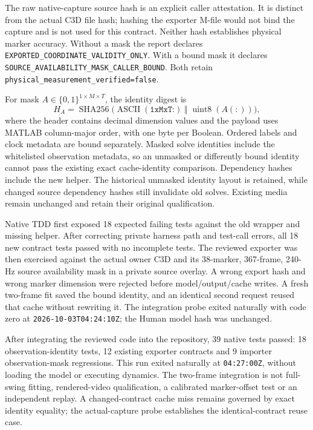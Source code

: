 \documentclass[11pt,a4paper]{article}
\begin{document}
The raw native-capture source hash is an explicit caller attestation. It is distinct
from the actual C3D file hash; hashing the exporter M-file would not bind the
capture and is not used for this contract. Neither hash establishes physical
marker accuracy. Without a mask the report declares
\texttt{EXPORTED\_COORDINATE\_VALIDITY\_ONLY}. With a bound mask it declares
\texttt{SOURCE\_AVAILABILITY\_MASK\_CALLER\_BOUND}. Both retain
\texttt{physical\_measurement\_verified=false}.

For mask $A\in\{0,1\}^{1\times M\times T}$, the identity digest is
\[
 H_A=\operatorname{SHA256}\bigl(
   \operatorname{ASCII}(\texttt{1xMxT:})\;\Vert\;
   \operatorname{uint8}(A(:))\bigr),
\]
where the header contains decimal dimension values and the payload uses
MATLAB column-major order, with one byte per Boolean. Ordered labels and
clock metadata are bound separately. Masked solve identities include the
whitelisted observation metadata, so an unmasked or differently bound
identity cannot pass the existing exact cache-identity comparison.
Dependency hashes include the new helper. The historical unmasked identity
layout is retained, while changed source dependency hashes still invalidate
old solves. Existing media remain unchanged and retain their original
qualification.

Native TDD first exposed 18 expected failing tests against the old wrapper
and missing helper. After correcting private harness path and test-call
errors, all 18 new contract tests passed with no incomplete tests. The
reviewed exporter was then exercised against the actual owner C3D and its
38-marker, 367-frame, 240-Hz source availability mask in a private source
overlay. A wrong export hash and wrong marker dimension were rejected before
model/output/cache writes. A fresh two-frame fit saved the bound identity,
and an identical second request reused that cache without rewriting it.
The integration probe exited naturally with code zero at
\texttt{2026-10-03T04:24:10Z}; the Human model hash was unchanged.

After integrating the reviewed code into the repository, 39 native tests
passed: 18 observation-identity tests, 12 existing exporter contracts and
9 importer observation-mask regressions. This run exited naturally at
\texttt{04:27:00Z}, without loading the model or executing dynamics.
The two-frame integration is not full-swing fitting, rendered-video
qualification, a calibrated marker-offset test or an independent replay.
A changed-contract cache miss remains governed by exact identity equality;
the actual-capture probe establishes the identical-contract reuse case.
\end{document}
